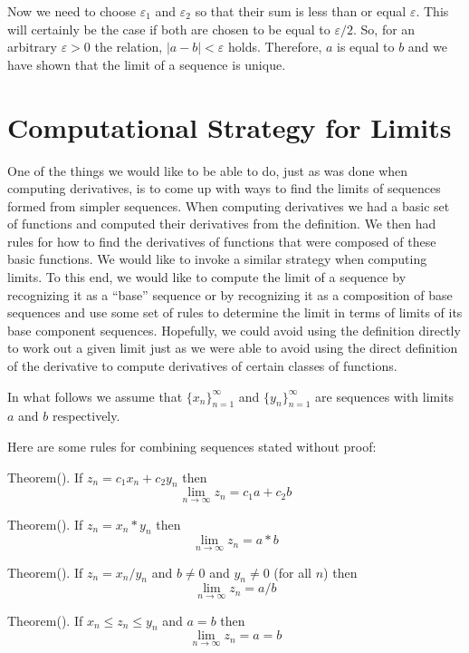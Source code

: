Now we need to choose $\varepsilon_1$ and $\varepsilon_2$ so that their sum is 
less than or equal $\varepsilon$. This will certainly be the case if both are 
chosen to be equal to $\varepsilon / 2$. 
So, for an arbitrary $\varepsilon>0$ the relation,
$|a-b| < \varepsilon$ holds. Therefore, $a$ is equal to $b$ 
and we have shown that 
the limit of a sequence is unique.

\section{Computational Strategy for Limits}
One of the things we would like to be able to do, just as was done when computing
derivatives, is to come up with ways to find the limits of sequences formed 
from simpler sequences. When computing derivatives we had a basic set of
functions and computed their derivatives from the definition. We then had 
rules for how to find 
the derivatives of functions that were composed of these basic functions. 
We would like to invoke a similar strategy when computing limits. To this 
end, we 
would like to compute the limit of a sequence by recognizing it as a ``base'' sequence or by
recognizing it as a composition of base sequences and use some set of rules to 
determine the limit in terms of limits of its base component sequences.
Hopefully, we could avoid using the definition directly to work 
out a given limit just as we were able to avoid using the direct definition of 
the derivative to compute derivatives of certain classes of functions.

In what follows we assume that $\{x_n\}_{n=1}^{\infty}$ and
$\{y_n\}_{n=1}^{\infty}$ are sequences with limits $a$ and $b$ 
respectively. 

Here are some rules for combining sequences stated without proof:

\proclaim Theorem(). If $z_n = c_1 x_n + c_2 y_n$ then 
$$
\lim_{n \rightarrow \infty} z_n = c_1 a + c_2 b
$$

\proclaim Theorem(). If $z_n = x_n * y_n$ then 
$$
\lim_{n \rightarrow \infty} z_n = a * b
$$

\proclaim Theorem(). If $z_n = x_n / y_n$ and 
$b \neq 0$ and $y_n \neq 0$ (for all $n$) then
$$
\lim_{n \rightarrow \infty} z_n = a / b 
$$

\proclaim Theorem(). If $x_n \le z_n \le y_n$ and $a = b$ then
$$
\lim_{n \rightarrow \infty} z_n = a = b
$$


